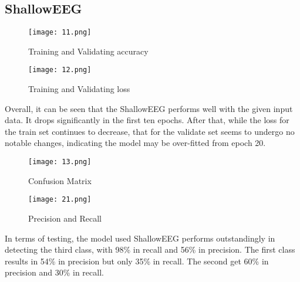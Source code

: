 \documentclass[]{report}
\begin{document}
\subsection{ShallowEEG}
\begin{figure}[H]
  \centering
  \begin{minipage}[b]{0.45\textwidth}
    \texttt{[image: 11.png]}
    \caption{Training and Validating accuracy}
  \end{minipage}
  \hfill
  \centering
  \begin{minipage}[b]{0.45\textwidth}
    \texttt{[image: 12.png]}
    \caption{Training and Validating loss}
  \end{minipage}
\end{figure}
Overall, it can be seen that the ShallowEEG performs well with the given input data. It drops significantly in the first ten epochs. After that, while the loss for the train set continues to decrease, that for the validate set seems to undergo no notable changes, indicating the model may be over-fitted from epoch 20.\\
\begin{figure}[H]
  \centering
  \begin{minipage}[b]{0.45\textwidth}
    \texttt{[image: 13.png]}
    \caption{Confusion Matrix}
  \end{minipage}
  \hfill
  \centering
  \begin{minipage}[b]{0.45\textwidth}
    \texttt{[image: 21.png]}
    \caption{Precision and Recall}
  \end{minipage}
\end{figure}
\noindent In terms of testing, the model used ShallowEEG performs outstandingly in detecting the third class, with 98\% in recall and 56\% in precision. The first class results in 54\% in precision but only 35\% in recall. The second get 60\% in precision and 30\% in recall.
\end{document}
